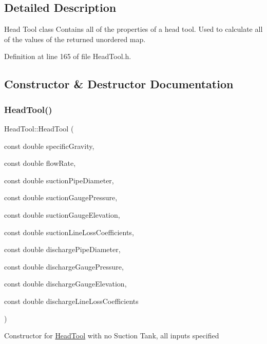 \subsection{Detailed Description}
Head Tool class Contains all of the properties of a head tool. Used to calculate all of the values of the returned unordered map. 

Definition at line 165 of file Head\+Tool.\+h.



\subsection{Constructor \& Destructor Documentation}
\mbox{\label{class_head_tool_a9934c87c8f8eb515ff32e46c74004c0e}} 
\subsubsection{\texorpdfstring{Head\+Tool()}{HeadTool()}}
{\footnotesize\ttfamily Head\+Tool\+::\+Head\+Tool (\begin{DoxyParamCaption}\item[{const double}]{specific\+Gravity,  }\item[{const double}]{flow\+Rate,  }\item[{const double}]{suction\+Pipe\+Diameter,  }\item[{const double}]{suction\+Gauge\+Pressure,  }\item[{const double}]{suction\+Gauge\+Elevation,  }\item[{const double}]{suction\+Line\+Loss\+Coefficients,  }\item[{const double}]{discharge\+Pipe\+Diameter,  }\item[{const double}]{discharge\+Gauge\+Pressure,  }\item[{const double}]{discharge\+Gauge\+Elevation,  }\item[{const double}]{discharge\+Line\+Loss\+Coefficients }\end{DoxyParamCaption})\hspace{0.3cm}{\ttfamily [inline]}}

Constructor for \hyperlink{class_head_tool}{Head\+Tool} with no Suction Tank, all inputs specified


